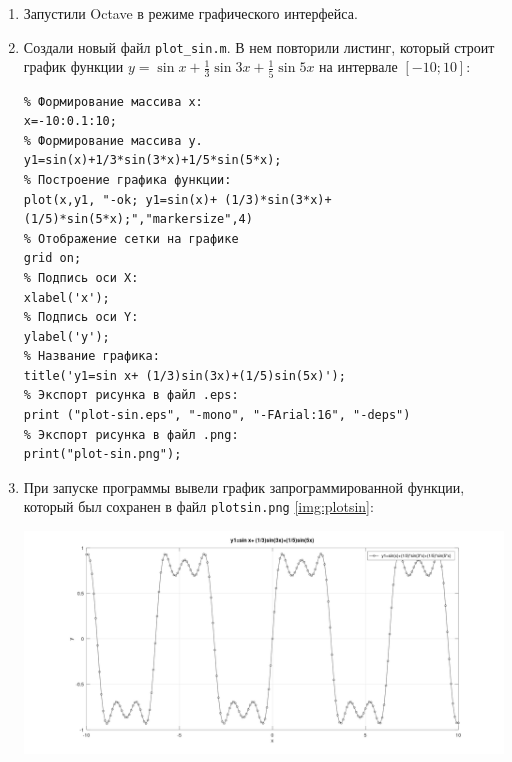 \begin{enumerate}
    \item Запустили Octave в режиме графического интерфейса.
    \item Создали новый файл \texttt{plot\_sin.m}. В нем повторили листинг,
        который строит график функции \(y = \sin{x} + \frac{1}{3} \sin{3x} + \frac{1}{5} \sin{5x} \)
        на интервале \([-10;10]\):

        \begin{verbatim}
% Формирование массива x:
x=-10:0.1:10;
% Формирование массива y.
y1=sin(x)+1/3*sin(3*x)+1/5*sin(5*x);
% Построение графика функции:
plot(x,y1, "-ok; y1=sin(x)+ (1/3)*sin(3*x)+(1/5)*sin(5*x);","markersize",4)
% Отображение сетки на графике
grid on;
% Подпись оси X:
xlabel('x');
% Подпись оси Y:
ylabel('y');
% Название графика:
title('y1=sin x+ (1/3)sin(3x)+(1/5)sin(5x)');
% Экспорт рисунка в файл .eps:
print ("plot-sin.eps", "-mono", "-FArial:16", "-deps")
% Экспорт рисунка в файл .png:
print("plot-sin.png");
        \end{verbatim}

    \item При запуске программы вывели график запрограммированной функции, который
        был сохранен в файл \texttt{plot\-sin.png} \ref{img:plotsin}:

        \begin{center}
            \centering
            \includegraphics[width=\textwidth]{../octave/plot-sin.png}
            \label{img:plotsin}
        \end{center}


\end{enumerate}
